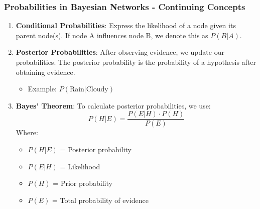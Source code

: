 \documentclass[aspectratio=169]{beamer}
\begin{document}
\begin{frame}[fragile]
    \frametitle{Probabilities in Bayesian Networks - Continuing Concepts}

    \begin{enumerate}[resume]
        \item \textbf{Conditional Probabilities}:
            Express the likelihood of a node given its parent node(s). If node A influences node B, we denote this as \( P(B | A) \).

        \item \textbf{Posterior Probabilities}:
            After observing evidence, we update our probabilities. The posterior probability is the probability of a hypothesis after obtaining evidence.
            \begin{itemize}
                \item Example: \( P(\text{Rain} | \text{Cloudy}) \)
            \end{itemize}
            
        \item \textbf{Bayes' Theorem}:
            To calculate posterior probabilities, we use:
            \begin{equation}
            P(H | E) = \frac{P(E | H) \cdot P(H)}{P(E)}
            \end{equation}
            Where:
            \begin{itemize}
                \item \( P(H | E) \) = Posterior probability
                \item \( P(E | H) \) = Likelihood
                \item \( P(H) \) = Prior probability
                \item \( P(E) \) = Total probability of evidence
            \end{itemize}
    \end{enumerate}
\end{frame}
\end{document}

